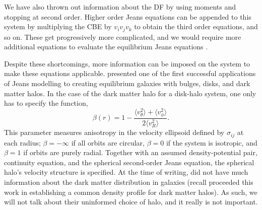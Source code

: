 We have also thrown out information about the DF by using moments and stopping at second order. Higher order Jeans equations can be appended to this system by multiplying the CBE by $v_i v_j v_k$ to obtain the third order equations, and so on. These get progressively more complicated, and we would require more additional equations to evaluate the equilibrium Jeans equations \citep{BT}.

Despite these shortcomings, more information can be imposed on the system to make these equations applicable. \citet{hernquist_1993} presented one of the first successful applications of Jeans modelling to creating equilibrium galaxies with bulges, disks, and dark matter halos. In the case of the dark matter halo for a disk-halo system, one only has to specify the function,
\begin{equation}
\beta(r) = 1 - \frac{\langle v_\theta^2\rangle + \langle v_\phi^2 \rangle}{2 \langle v_R^2 \rangle}.
\end{equation}
This parameter measures anisotropy in the velocity ellipsoid defined by $\sigma_{ij}$ at each radius; $\beta = -\infty$ if all orbits are circular, $\beta=0$ if the system is isotropic, and $\beta = 1$ if orbits are purely radial. Together with an assumed density-potential pair, continuity equation, and the spherical second-order Jeans equation, the spherical halo's velocity structure is specified. At the time of writing, \citet{hernquist_1993} did not have much information about the dark matter distribution in galaxies (recall \citep{nfw} proceeded this work in establishing a common density profile for dark matter halos). As such, we will not talk about their uninformed choice of halo, and it really is not important.

